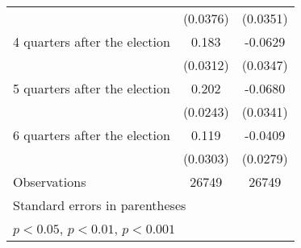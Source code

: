 \begin{table}[htbp]
\begin{tabular}{l*{2}{c}}
                    &    (0.0376)         &    (0.0351)         \\
[1em]
 4 quarters after the election&       0.183\sym{***}&     -0.0629         \\
                    &    (0.0312)         &    (0.0347)         \\
[1em]
 5 quarters after the election&       0.202\sym{***}&     -0.0680\sym{*}  \\
                    &    (0.0243)         &    (0.0341)         \\
[1em]
 6 quarters after the election&       0.119\sym{***}&     -0.0409         \\
                    &    (0.0303)         &    (0.0279)         \\
\hline
Observations        &       26749         &       26749         \\
\hline\hline
\multicolumn{3}{l}{\footnotesize Standard errors in parentheses}\\
\multicolumn{3}{l}{\footnotesize \sym{*} \(p<0.05\), \sym{**} \(p<0.01\), \sym{***} \(p<0.001\)}\\
\end{tabular}
\end{table}
